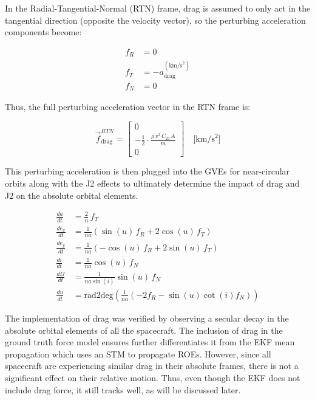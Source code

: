 In the Radial-Tangential-Normal (RTN) frame, drag is assumed to only act in the tangential direction (opposite the velocity vector), so the perturbing acceleration components become:

\begin{equation}
    \begin{aligned}
        f_R &= 0 \\
        f_T &= -a_{\text{drag}}^{(\text{km/s}^2)} \\
        f_N &= 0
    \end{aligned}
\end{equation}

Thus, the full perturbing acceleration vector in the RTN frame is:

\begin{equation}
    \vec{f}_{\text{drag}}^{RTN} =
    \begin{bmatrix}
        0 \\
        -\frac{1}{2} \cdot \frac{\rho \, v^2 \, C_D \, A}{m} \\
        0
    \end{bmatrix}
    \quad \text{[km/s$^2$]}
\end{equation}

This perturbing acceleration is then plugged into the GVEs for near-circular orbits along with the J2 effects to ultimately determine the impact of drag and J2 on the absolute orbital elements. 

\begin{align*}
\frac{da}{dt} &= \frac{2}{n} \, f_T \\
\frac{d e_x}{dt} &= \frac{1}{n a} \left( \sin(u) \, f_R + 2 \cos(u) \, f_T \right) \\
\frac{d e_y}{dt} &= \frac{1}{n a} \left( -\cos(u) \, f_R + 2 \sin(u) \, f_T \right) \\
\frac{di}{dt} &= \frac{1}{n a} \cos(u) \, f_N \\
\frac{d\Omega}{dt} &= \frac{1}{n a \sin(i)} \sin(u) \, f_N \\
\frac{du}{dt} &= \mathrm{rad2deg} \left( \frac{1}{n a} \left( -2 f_R - \sin(u) \cot(i) f_N \right) \right)
\end{align*}

The implementation of drag was verified by observing a secular decay in the absolute orbital elements of all the spacecraft. The inclusion of drag in the ground truth force model ensures further differentiates it from the EKF mean propagation which uses an STM to propagate ROEs. However, since all spacecraft are experiencing similar drag in their absolute frames, there is not a significant effect on their relative motion. Thus, even though the EKF does not include drag force, it still tracks well, as will be discussed later. 

